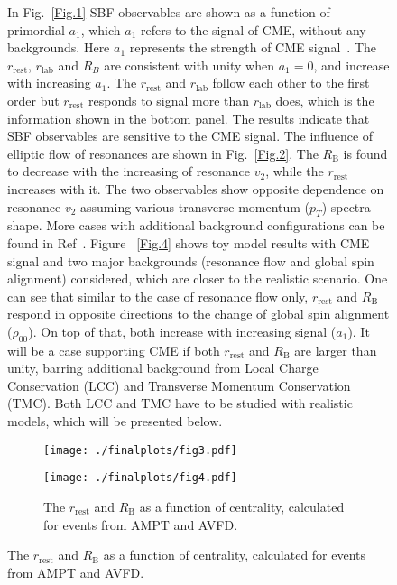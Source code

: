 \begin{figure}[htbp]
In Fig.~\ref{Fig.1} SBF observables are shown as a function of primordial $a_1$, which $a_1$ refers to the signal of CME, without any backgrounds. Here $a_1$ represents the strength of CME signal~\cite{tang2019probe}. The $r_{\mathrm{rest}}$, $r_{\mathrm{lab}}$ and $R_{B}$ are consistent with unity when $a_{1}=0$, and increase with increasing $a_{1}$. The $r_{\mathrm{rest}}$ and $r_{\mathrm{lab}}$ follow each other to the first order but $r_{\mathrm{rest}}$ responds to signal more than $r_{\mathrm{lab}}$ does, which is the information shown in the bottom panel.  The results indicate that SBF observables are sensitive to the CME signal. 
The influence of elliptic flow of resonances are shown in Fig.~\ref{Fig.2}. The $R_{\mathrm{B}}$  is found to decrease with the increasing of resonance $v_2$, while the $r_{\mathrm{rest}}$  increases with it. The two observables show opposite dependence on resonance $v_2$  assuming various transverse momentum ($p_{T}$) spectra shape.  More cases with additional background configurations can be found in Ref~\cite{tang2019probe}. 
Figure ~\ref{Fig.4} shows toy model results with CME signal and two major backgrounds (resonance flow and global spin alignment) considered, which are  closer to the realistic scenario. One can see that similar to the case of resonance flow only, $r_{\mathrm{rest}}$  and $R_{\mathrm{B}}$ respond in opposite directions to the change of global spin alignment ($\rho_{00}$). On top of that, both increase with increasing signal ($a_1$). It will be a case supporting CME if both $r_{\mathrm{rest}}$ and $R_{\mathrm{B}}$ are larger than unity, barring additional background from Local Charge Conservation (LCC) and Transverse Momentum Conservation (TMC). Both LCC and TMC have to be studied with realistic models, which will be presented below. 


\begin{figure}[htbp!]
\vspace{-0.25cm}
\centering 
\begin{minipage}[b]{0.33\textwidth} %
\centering 
\texttt{[image: ./finalplots/fig3.pdf]}
\caption{ The $r_{\mathrm{rest}}$ and $R_{\mathrm{B}}$ as a function of resonance $\rho_{00}$ for various $a_{1}$ values obtained for the toymodel~\cite{tang2019probe}).}
\label{Fig.4}
\end{minipage}
\hspace{0.45cm}
\begin{minipage}[b]{0.33\textwidth} 
\centering 
\texttt{[image: ./finalplots/fig4.pdf]}
\caption{The $r_{\mathrm{rest}}$ and $R_{\mathrm{B}}$ as a function of centrality, calculated for events from AMPT and AVFD. }
\label{fig:AMPT_AVFD}
\end{minipage}
\end{figure}
\vspace{-0.18cm}


\end{figure}
